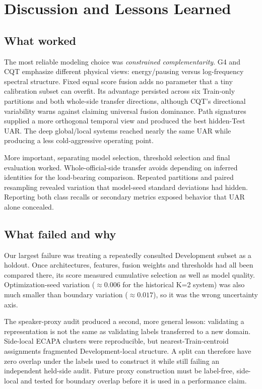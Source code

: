 \section{Discussion and Lessons Learned}
\label{sec:discussion}

\subsection{What worked}

The most reliable modeling choice was \emph{constrained complementarity}.
G4 and CQT emphasize different physical views: energy/pausing versus
log-frequency spectral structure. Fixed equal score fusion adds no
parameter that a tiny calibration subset can overfit. Its advantage persisted
across six Train-only partitions and both whole-side transfer directions,
although CQT's directional variability warns against claiming universal fusion
dominance. Path signatures supplied a more orthogonal temporal view and
produced the best hidden-Test UAR. The deep global/local systems reached nearly
the same UAR while producing a less cold-aggressive operating point.

More important, separating model selection, threshold selection and final
evaluation worked. Whole-official-side transfer avoids depending on inferred
identities for the load-bearing comparison. Repeated partitions and paired
resampling revealed variation that model-seed standard deviations had hidden.
Reporting both class recalls or secondary metrics exposed behavior that UAR
alone concealed.

\subsection{What failed and why}

Our largest failure was treating a repeatedly consulted Development subset as
a holdout. Once architectures, features, fusion weights and thresholds had all
been compared there, its score measured cumulative selection as well as model
quality. Optimization-seed variation ($\approx0.006$ for the historical K=2
system) was also much smaller than boundary variation ($\approx0.017$), so it
was the wrong uncertainty axis.

The speaker-proxy audit produced a second, more general lesson: validating a
representation is not the same as validating labels transferred to a new
domain. Side-local ECAPA clusters were reproducible, but nearest-Train-centroid
assignments fragmented Development-local structure. A split can therefore
have zero overlap under the labels used to construct it while still failing an
independent held-side audit. Future proxy construction must be label-free,
side-local and tested for boundary overlap before it is used in a performance
claim.

